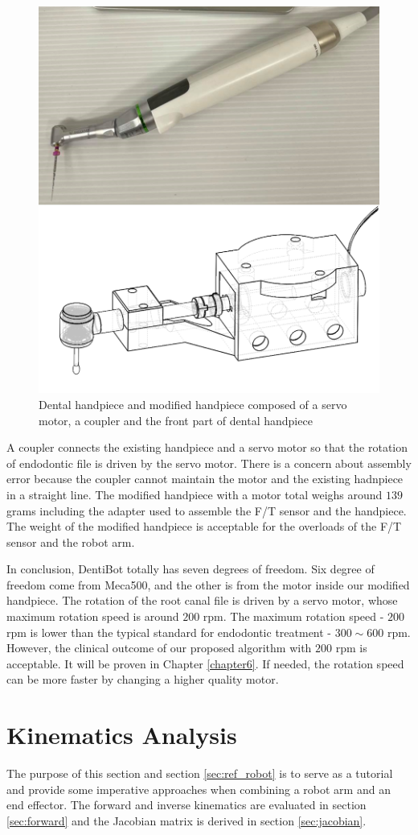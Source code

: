 \begin{figure}[htbp]
\begin{center}
\includegraphics[width=0.6\linewidth]{Images/modified_handpiece.png}
\caption{
Dental handpiece and modified handpiece composed of a servo motor, a coupler and the front part of dental handpiece
}\label{fig:modified_handpiece}
\end{center}
\end{figure}	
\par
A coupler connects the existing handpiece and a servo motor so that the rotation of endodontic file is driven by the servo motor. There is a concern about assembly error because the coupler cannot maintain the motor and the existing hadnpiece in a straight line. The modified handpiece with a motor total weighs around $139$ grams including the adapter used to assemble the F/T sensor and the handpiece. The weight of the modified handpiece is acceptable for the overloads of the F/T sensor and the robot arm.
\par
In conclusion, DentiBot totally has seven degrees of freedom. Six degree of freedom come from Meca500, and the other is from the motor inside our modified handpiece. The rotation of the root canal file is driven by a servo motor, whose maximum rotation speed is around $200$ rpm. The maximum rotation speed - $200$ rpm is lower than the typical standard for endodontic treatment - $300 \sim 600$ rpm. However, the clinical outcome of our proposed algorithm with $200$ rpm is acceptable. It will be proven in Chapter \ref{chapter6}. If needed, the rotation speed can be more faster by changing a higher quality motor.
\newpage													
\section{Kinematics Analysis}
\label{sec:kinematics}
\hspace*{6mm}The purpose of this section and section \ref{sec:ref_robot} is to serve as a tutorial and provide some imperative approaches when combining a robot arm and an end effector. The forward and inverse kinematics are evaluated in section \ref{sec:forward} and the Jacobian matrix is derived in section \ref{sec:jacobian}. 
